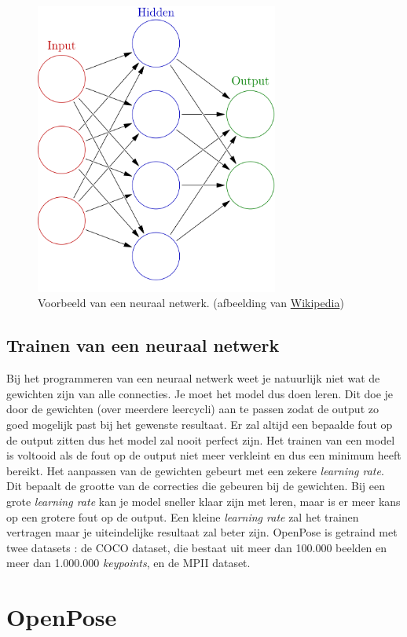 \documentclass[a4paper,twoside,kulak]{kulakreport}
\begin{document}
\begin{figure}
	\begin{center}
		\includegraphics[width=8cm]{netwerk.png}
	\end{center}
	\caption{Voorbeeld van een neuraal netwerk. (afbeelding van \href{wikipedia.org}{Wikipedia})}
	\label{netwerk}
\end{figure}

\subsection{Trainen van een neuraal netwerk}
Bij het programmeren van een neuraal netwerk weet je natuurlijk niet wat de gewichten zijn van alle connecties. Je moet het model dus doen leren. Dit doe je door de gewichten (over meerdere leercycli) aan te passen zodat de output zo goed mogelijk past bij het gewenste resultaat. Er zal altijd een bepaalde fout op de output zitten dus het model zal nooit perfect zijn. Het trainen van een model is voltooid als de fout op de output niet meer verkleint en dus een minimum heeft bereikt. Het aanpassen van de gewichten gebeurt met een zekere \emph{learning rate}. Dit bepaalt de grootte van de correcties die gebeuren bij de gewichten. Bij een grote \emph{learning rate} kan je model sneller klaar zijn met leren, maar is er meer kans op een grotere fout op de output. Een kleine \emph{learning rate} zal het trainen vertragen maar je uiteindelijke resultaat zal beter zijn. OpenPose is getraind met twee datasets \cite{openpose}: de COCO dataset, die bestaat uit meer dan 100.000 beelden en meer dan 1.000.000 \emph{keypoints}, en de MPII dataset.
\section{OpenPose}
\end{document}
